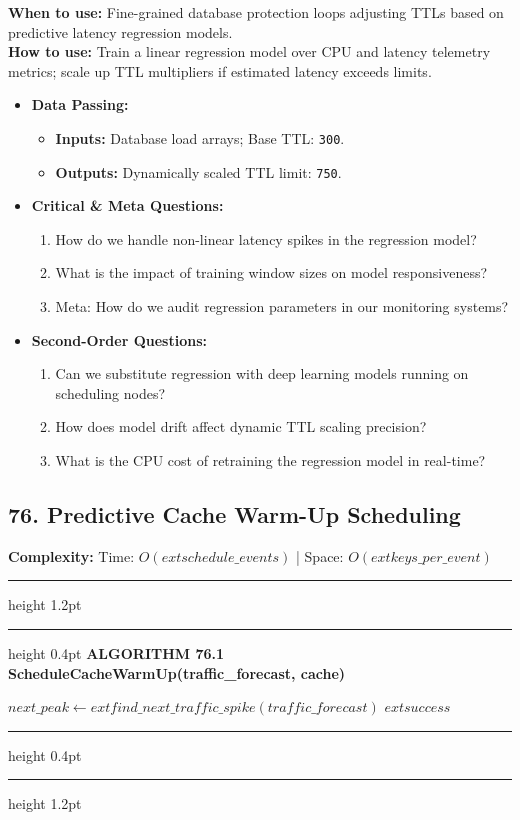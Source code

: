 \documentclass[11pt,a4paper]{article}
\newenvironment{textbookalgo}[2]{%
  \par\addvspace{1.2em}\noindent
  \hrule height 1.2pt
  \vspace{1.5pt}
  \hrule height 0.4pt
  \vspace{5pt}
  {\noindent\large\bfseries\sffamily ALGORITHM #1 \quad #2}
  \par\vspace{5pt}
  \RestyleAlgo{plain}
}{%
  \par\vspace{4pt}
  \hrule height 0.4pt
  \vspace{1.5pt}
  \hrule height 1.2pt
  \par\addvspace{1.2em}
}
\theoremstyle{definition}
\begin{document}
\noindent
\textbf{When to use:} Fine-grained database protection loops adjusting TTLs based on predictive latency regression models.\\
\textbf{How to use:} Train a linear regression model over CPU and latency telemetry metrics; scale up TTL multipliers if estimated latency exceeds limits.
\begin{itemize}[leftmargin=*]
  \item[] \textbf{Data Passing:}
    \begin{itemize}
      \item \textbf{Inputs:} Database load arrays; Base TTL: \texttt{300}.
      \item \textbf{Outputs:} Dynamically scaled TTL limit: \texttt{750}.
    \end{itemize}
  \item[] \textbf{Critical \& Meta Questions:}
  \begin{enumerate}
    \item How do we handle non-linear latency spikes in the regression model?
    \item What is the impact of training window sizes on model responsiveness?
    \item Meta: How do we audit regression parameters in our monitoring systems?
  \end{enumerate}
  \item[] \textbf{Second-Order Questions:}
  \begin{enumerate}
    \item Can we substitute regression with deep learning models running on scheduling nodes?
    \item How does model drift affect dynamic TTL scaling precision?
    \item What is the CPU cost of retraining the regression model in real-time?
  \end{enumerate}
\end{itemize}
\medskip

\clearpage
\subsection{76. Predictive Cache Warm-Up Scheduling}


\noindent
\textbf{Complexity:} Time: $O(	ext{schedule\_events})$ | Space: $O(	ext{keys\_per\_event})$
\smallskip

\begin{textbookalgo}{76.1}{ScheduleCacheWarmUp(traffic\_forecast, cache)}
\begin{algorithm}[H]
$next\_peak \leftarrow 	ext{find\_next\_traffic\_spike}(traffic\_forecast)$\;
\Return $	ext{success}$\;
\end{algorithm}
\end{textbookalgo}
\end{document}

